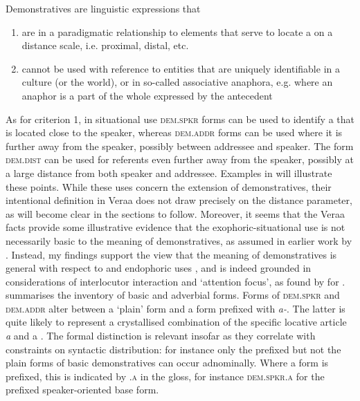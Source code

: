 \documentclass[output=paper
,modfonts
,nonflat]{langsci/langscibook}
\begin{document}
\newpage 
\begin{exe}
\ex Demonstratives are linguistic expressions that 
\begin{enumerate} 
\item	are in a paradigmatic relationship to elements that serve to locate a  on a distance scale, i.e. proximal, distal, etc.
\item	cannot be used with reference to entities that are uniquely identifiable in a culture (or the world), or in so-called associative anaphora, e.g. where an anaphor is a part of the whole expressed by the antecedent
\end{enumerate}
\end{exe}

\noindent\largerpage[-1]
As for criterion 1, in situational use \textsc{dem.spkr} forms can be used to identify a  that is located close to the speaker, whereas \textsc{dem.addr} forms can be used where it is further away from the speaker, possibly between addressee and speaker. The form \textsc{dem.dist} can be used for referents even further away from the speaker, possibly at a large distance from both speaker and addressee. Examples in  will illustrate these points. While these uses concern the extension of demonstratives, their intentional definition in Vera{\textquotesingle}a does not draw precisely on the distance parameter, as will become clear in the sections to follow. Moreover, it seems that the Vera{\textquotesingle}a facts provide some illustrative evidence that the exophoric-situational use is not necessarily basic to the meaning of demonstratives, as assumed in earlier work by \citealp[93]{Diessel1999}. Instead, my findings support the view that the meaning of demonstratives is general with respect to  and endophoric uses \citep[cf.][242]{Himmelmann1996}, and is indeed grounded in considerations of interlocutor interaction and `attention focus', as found by \cite{Enfield2003} for  \citep[cf. also][]{Diessel2006}.  summarises the inventory of basic and adverbial  forms. Forms of \textsc{dem.spkr} and \textsc{dem.addr} alter between a `plain' form and a form prefixed with \textit{a-}. The latter is quite likely to represent a crystallised combination of the specific locative article \textit{a} and a . The formal distinction is relevant insofar as they correlate with constraints on syntactic distribution: for instance only the prefixed but not the plain forms of basic demonstratives can occur adnominally. Where a form is prefixed, this is indicated by \textsc{.a} in the gloss, for instance \textsc{dem.spkr.a} for the prefixed speaker-oriented base form.
\end{document}
